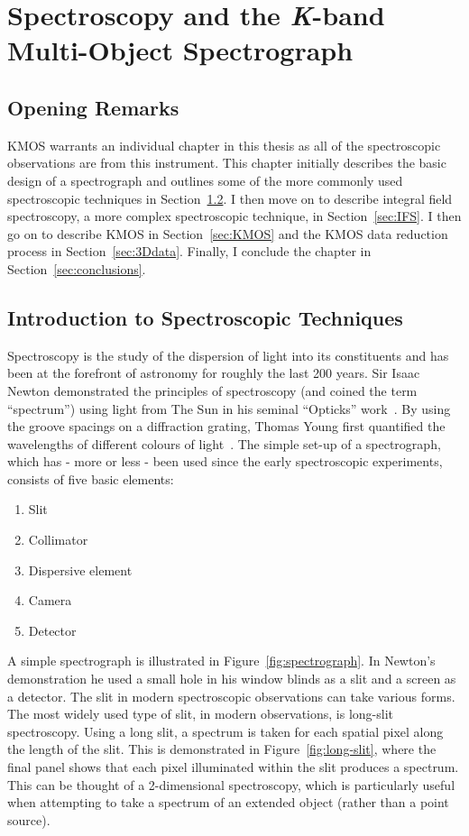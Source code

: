 \chapter{Spectroscopy and the {\it K}-band Multi-Object Spectrograph}
\label{ch:kmos}
\section{Opening Remarks} %
\label{sec:opening_remarks}
KMOS warrants an individual chapter in this thesis as all of the spectroscopic observations are from this instrument.
This chapter initially describes the basic design of a spectrograph and outlines some of the more commonly used spectroscopic techniques in Section~\ref{sec:intro_to_spec}.
I then move on to describe integral field spectroscopy, a more complex spectroscopic technique, in Section~\ref{sec:IFS}.
I then go on to describe KMOS in Section~\ref{sec:KMOS} and the KMOS data reduction process in Section~\ref{sec:3Ddata}.
Finally, I conclude the chapter in Section~\ref{sec:conclusions}.



\section{Introduction to Spectroscopic Techniques} %
\label{sec:intro_to_spec}

Spectroscopy is the study of the dispersion of light into its constituents and has been at the forefront of astronomy for roughly the last 200 years.
Sir Isaac Newton demonstrated the principles of spectroscopy (and coined the term ``spectrum'') using light from The Sun in his seminal ``Opticks'' work~\citep{b:Newton}.
By using the groove spacings on a diffraction grating, Thomas Young first quantified the wavelengths of different colours of light~\citep{1802PTRSL.92.12Y}.
The simple set-up of a spectrograph, which has - more or less - been used since the early spectroscopic experiments, consists of five basic elements:


\begin{enumerate}
    \item Slit
    \item Collimator
    \item Dispersive element
    \item Camera
    \item Detector
\end{enumerate}

A simple spectrograph is illustrated in Figure~\ref{fig:spectrograph}.
In Newton's demonstration he used a small hole in his window blinds as a slit and a screen as a detector.
The slit in modern spectroscopic observations can take various forms.
The most widely used type of slit, in modern observations, is long-slit spectroscopy.
Using a long slit, a spectrum is taken for each spatial pixel along the length of the slit.
This is demonstrated in Figure~\ref{fig:long-slit}, where the final panel shows that each pixel illuminated within the slit produces a spectrum.
This can be thought of a 2-dimensional spectroscopy, which is particularly useful when attempting to take a spectrum of an extended object
(rather than a point source).

